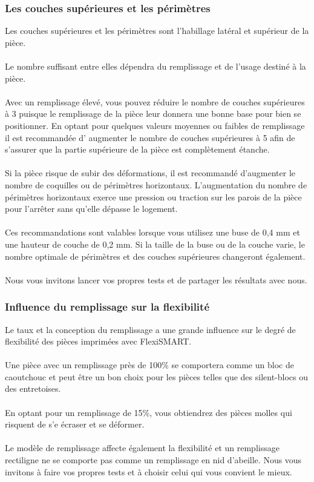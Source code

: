 \documentclass[11pt,a4paper]{article}
\begin{document}
		\subsubsection{Les couches supérieures et les périmètres}
Les couches supérieures et les périmètres sont l’habillage latéral et supérieur de la pièce.
\\\\
Le nombre suffisant entre elles dépendra du remplissage et de l’usage destiné à la pièce.
\\\\
Avec un remplissage élevé, vous pouvez réduire le nombre de couches supérieures à 3 puisque le remplissage de la pièce leur donnera une bonne base pour bien se positionner. En optant pour quelques valeurs moyennes ou faibles de remplissage il est recommandée d’ augmenter le nombre de couches supérieures à 5 afin de s'assurer que la partie supérieure de la pièce est complètement étanche.
\\\\
Si la pièce risque de subir des déformations, il est recommandé d’augmenter le nombre de coquilles ou de périmètres horizontaux. L'augmentation du nombre de périmètres horizontaux exerce une pression ou traction sur les parois de la pièce pour l’arrêter sans qu’elle dépasse le logement.
\\\\
Ces recommandations sont valables lorsque vous utilisez une buse de 0,4 mm et une hauteur de couche de 0,2 mm. Si la taille de la buse ou de la couche varie, le nombre optimale de périmètres et des couches supérieures changeront également.
\\\\
Nous vous invitons lancer vos propres tests et de partager les résultats avec nous.
		\subsubsection{Influence du remplissage sur la flexibilité}
Le taux et la conception du remplissage a une grande influence sur le degré de flexibilité des pièces imprimées avec FlexiSMART.
\\\\
Une pièce avec un remplissage près de 100\% se comportera comme un bloc de caoutchouc et peut être un bon choix pour les pièces telles que des silent-blocs ou des entretoises.
\\\\
En optant pour un remplissage de 15\%, vous obtiendrez des pièces molles qui risquent de s’e écraser et se déformer.
\\\\
Le modèle de remplissage affecte également la flexibilité et un remplissage rectiligne ne se comporte pas comme un remplissage en nid d'abeille. Nous vous invitons à faire vos propres tests et à choisir celui qui vous convient le mieux.
\end{document}
